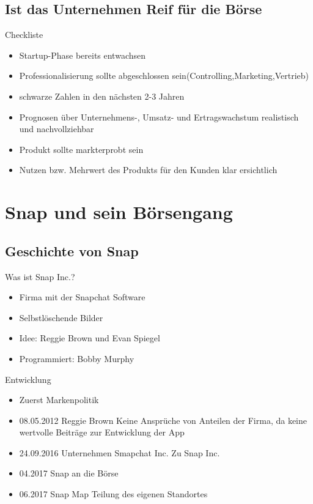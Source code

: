 \documentclass{beamer}
\begin{document}
\subsection{Ist das Unternehmen Reif für die Börse}
\begin{frame} {Checkliste}
\begin{itemize}
	\item Startup-Phase bereits entwachsen  
	\item Professionalisierung sollte abgeschlossen sein(Controlling,Marketing,Vertrieb)  
	\item schwarze Zahlen in den nächsten 2-3 Jahren   
	\item Prognosen über Unternehmens-, Umsatz- und Ertragswachstum realistisch und nachvollziehbar 
	 \item Produkt sollte markterprobt sein 
	 \item Nutzen bzw. Mehrwert des Produkts für den Kunden  klar ersichtlich 
\end{itemize}
\end{frame}


\section{Snap und sein Börsengang}

\subsection{Geschichte von Snap}
\begin{frame} {Was ist Snap Inc.?}
\begin{itemize}
	\item Firma mit der Snapchat Software 
	\item  Selbstlöschende Bilder
	\item  Idee: Reggie Brown und Evan Spiegel
	\item  Programmiert: Bobby Murphy
\end{itemize}
\end{frame}

\begin{frame} {Entwicklung}
\begin{itemize}
\item Zuerst Markenpolitik \pause
\item  08.05.2012 Reggie Brown Keine Ansprüche von Anteilen der Firma, da keine wertvolle Beiträge zur Entwicklung der App \pause
\item  24.09.2016 Unternehmen Smapchat Inc. Zu Snap Inc. \pause
\item  04.2017 Snap an die Börse \pause
\item 06.2017 Snap Map Teilung des eigenen Standortes \pause

\end{itemize}
\end{frame}
\end{document}
